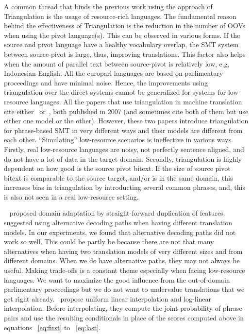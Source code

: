  
 A common thread that binds the previous work using the approach of Triangulation is the usage of resource-rich languages. The fundamental reason behind the effectiveness of Triangulation is the reduction in the number of OOVs when using the pivot language(s). This can be observed in various forms. If the source and pivot language have a healthy vocabulary overlap, the SMT system between source-pivot is large, thus, improving translations. This factor also helps when the amount of parallel text between source-pivot is relatively low, e.g, Indonesian-English.  All the europarl languages are based on parlimentary proceedings and have minimal noise. Hence, the improvements using triangulation over the direct systems cannot be generalized for systems for low-resource languages. All the papers that use triangulation in machine translation cite either~\cite{Utiyama:07} or~\cite{Cohn:07}, both published in 2007 (and sometimes cite both of them but use either one model or the other). However, these two papers introduce triangulation for phrase-based SMT in very different ways and their models are different from each other. ``Simulating'' low-resource scenarios is ineffective in various ways. Firstly, real low-resource languages are noisy, not perfectly sentence aligned, and do not have a lot of data in the target domain. Secondly, triangulation is highly dependent on how good is the source pivot bitext. If the size of source pivot bitext is comparable to the source target, and/or is in the same domain, this increases bias in triangulation by introducting several common phrases, and, this is also not seen in a real low-resource setting.

  ~\cite{Hal:07} proposed domain adaptation by straight-forward duplication of features.~\cite{Bertoldi:08} suggested using alternative decoding paths when having different translation models. In our experiments, we found that alternative decoding paths did not work so well. This could be partly be because there are not that many alternatives when having two translation models of very different sizes and from different domains. When we do have alternative paths, they may not always be useful. Making trade-offs is a constant theme especially when facing low-resource languages. We want to maximize the good influence from the out-of-domain parlimentary proceedings but we do not want to undervalue translations that we get right already.~\cite{Cohn:07} propose uniform linear interpolation and log-linear interpolation. Before interpolating, they compute the joint probability of phrase pairs and use the resulting conditionals in place of the scores computed above in equations ~\eqref{eq:first} to ~\eqref{eq:last}.

